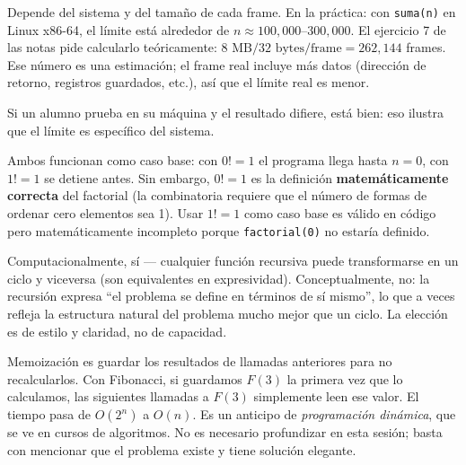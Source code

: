 \documentclass[12pt, oneside]{article}
\begin{document}
\begin{notaprofesor}
  Depende del sistema y del tamaño de cada frame.  En la práctica:
  con \texttt{suma(n)} en Linux x86-64, el límite está alrededor de
  $n \approx 100{,}000$--$300{,}000$.
  El ejercicio 7 de las notas pide calcularlo teóricamente:
  $8 \text{ MB} / 32 \text{ bytes/frame} = 262{,}144$ frames.
  Ese número es una estimación; el frame real incluye más datos
  (dirección de retorno, registros guardados, etc.), así que el límite
  real es menor.

  Si un alumno prueba en su máquina y el resultado difiere,
  está bien: eso ilustra que el límite es específico del sistema.
\end{notaprofesor}

\begin{notaprofesor}[FAQ 3 — ``¿Por qué el caso base de factorial es $0! = 1$ y no $1! = 1$?'']
  Ambos funcionan como caso base: con $0! = 1$ el programa llega hasta $n=0$,
  con $1! = 1$ se detiene antes.  Sin embargo, $0! = 1$ es la definición
  \textbf{matemáticamente correcta} del factorial (la combinatoria requiere
  que el número de formas de ordenar cero elementos sea 1).
  Usar $1! = 1$ como caso base es válido en código pero matemáticamente
  incompleto porque \texttt{factorial(0)} no estaría definido.
\end{notaprofesor}

\begin{notaprofesor}
  Computacionalmente, sí — cualquier función recursiva puede transformarse
  en un ciclo y viceversa (son equivalentes en expresividad).
  Conceptualmente, no: la recursión expresa ``el problema se define en
  términos de sí mismo'', lo que a veces refleja la estructura natural del
  problema mucho mejor que un ciclo.  La elección es de estilo y claridad,
  no de capacidad.
\end{notaprofesor}

\begin{notaprofesor}
  Memoización es guardar los resultados de llamadas anteriores para no
  recalcularlos.  Con Fibonacci, si guardamos $F(3)$ la primera vez que
  lo calculamos, las siguientes llamadas a $F(3)$ simplemente leen ese valor.
  El tiempo pasa de $O(2^n)$ a $O(n)$.  Es un anticipo de
  \textit{programación dinámica}, que se ve en cursos de algoritmos.
  No es necesario profundizar en esta sesión; basta con mencionar que
  el problema existe y tiene solución elegante.
\end{notaprofesor}
\end{document}
